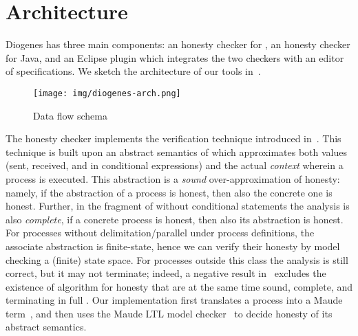 \section{Architecture}

Diogenes has three main components:
an honesty checker for \coco,
an honesty checker for Java,
and an Eclipse plugin which integrates the two checkers
with an editor of \coco specifications.
We sketch the architecture of our tools in~.

\begin{figure}[t]
    \texttt{[image: img/diogenes-arch.png]}
    \caption{Data flow schema}
    \label{fig:architecture}
\end{figure}

The \coco honesty checker implements the  
verification technique introduced in~\cite{BMSZ15jlamp}.
This technique is built upon an abstract semantics of \coco 
which approximates both values (sent, received, and in conditional expressions) 
and the actual \emph{context} wherein a process is executed.
This abstraction is a \emph{sound} over-approximation of honesty:
namely, if the abstraction of a process is honest,
then also the concrete one is honest.
Further, in the fragment of \coco without conditional statements
the analysis is also \emph{complete},
\ie if a concrete process is honest, then also its abstraction is honest.
For processes without delimitation/parallel under process definitions,
the associate abstraction is finite-state, 
hence we can verify their honesty by model checking a (finite) state space.
For processes outside this class the analysis is still correct, 
but it may not terminate; indeed, a negative result in~\cite{BZ15wsfm}
excludes the existence of algorithm for honesty that are at the same time
sound, complete, and terminating in full \coco.
Our implementation 
first translates a \coco process into a Maude term~\cite{Maude01}, 
and then uses the Maude LTL model checker~\cite{Eker02maude}
to decide honesty of its abstract semantics.



